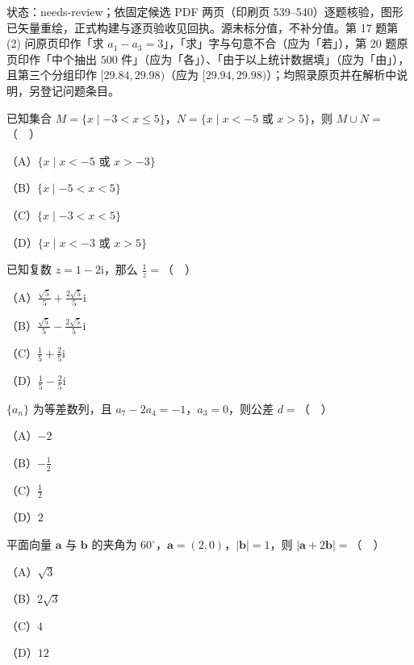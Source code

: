 

状态：needs-review；依固定候选 PDF 两页（印刷页 539–540）逐题核验，图形已矢量重绘，正式构建与逐页验收见回执。源未标分值，不补分值。第 17 题第 (2) 问原页印作「求 $a_1-a_3=3$」，「求」字与句意不合（应为「若」），第 20 题原页印作「中个抽出 $500$ 件」（应为「各」）、「由于以上统计数据填」（应为「由」），且第三个分组印作 $[29.84,29.98)$（应为 $[29.94,29.98)$）；均照录原页并在解析中说明，另登记问题条目。


\begin{question}
已知集合 $M=\{x\mid -3<x\leqslant5\}$，$N=\{x\mid x<-5$ 或 $x>5\}$，则 $M\cup N=$（　）

（A）$\{x\mid x<-5$ 或 $x>-3\}$

（B）$\{x\mid -5<x<5\}$

（C）$\{x\mid -3<x<5\}$

（D）$\{x\mid x<-3$ 或 $x>5\}$

\end{question}
\begin{question}
已知复数 $z=1-2\mathrm i$，那么 $\frac1z=$（　）

（A）$\frac{\sqrt5}{5}+\frac{2\sqrt5}{5}\mathrm i$

（B）$\frac{\sqrt5}{5}-\frac{2\sqrt5}{5}\mathrm i$

（C）$\frac15+\frac25\mathrm i$

（D）$\frac15-\frac25\mathrm i$

\end{question}
\begin{question}
$\{a_n\}$ 为等差数列，且 $a_7-2a_4=-1$，$a_3=0$，则公差 $d=$（　）

（A）$-2$

（B）$-\frac12$

（C）$\frac12$

（D）$2$

\end{question}
\begin{question}
平面向量 $\boldsymbol a$ 与 $\boldsymbol b$ 的夹角为 $60^\circ$，$\boldsymbol a=(2,0)$，$|\boldsymbol b|=1$，则 $|\boldsymbol a+2\boldsymbol b|=$（　）

（A）$\sqrt3$

（B）$2\sqrt3$

（C）$4$

（D）$12$

\end{question}
